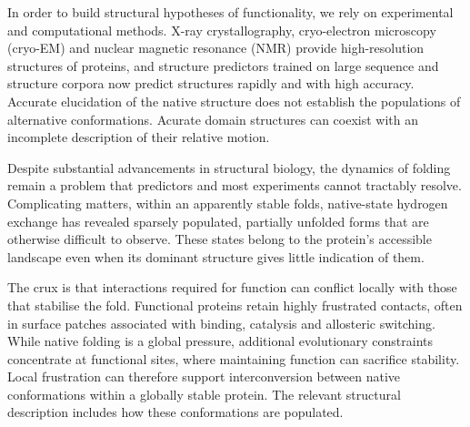 In order to build structural hypotheses of functionality, we rely on experimental and computational methods. X-ray crystallography, cryo-electron microscopy (cryo-EM) and nuclear magnetic resonance (NMR) provide high-resolution structures of proteins,\supercite{maveyraudProteinXrayCrystallography2020,baiHowCryoEMRevolutionizing2015,jamesAdvancesHydrogenDeuterium2022} and structure predictors trained on large sequence and structure corpora now predict structures rapidly and with high accuracy.\supercite{varadiAlphaFoldProteinStructure2022} Accurate elucidation of the native structure does not establish the populations of alternative conformations. Acurate domain structures can coexist with an incomplete description of their relative motion.\supercite{mccaffertyDoesAlphaFold2Model2023} 

Despite substantial advancements in structural biology, the dynamics of folding remain a problem that predictors and most experiments cannot tractably resolve.\supercite{laneMillisecondsChallengesSimulation2013,wilsonAlphaFold2RoleDisordered2022,mccaffertyDoesAlphaFold2Model2023} Complicating matters, within an apparently stable folds, native-state hydrogen exchange has revealed sparsely populated, partially unfolded forms that are otherwise difficult to observe.\supercite{englanderHydrogenExchangeModern1997} These states belong to the protein's accessible landscape even when its dominant structure gives little indication of them.


The crux is that interactions required for function can conflict locally with those that stabilise the fold. Functional proteins retain highly frustrated contacts, often in surface patches associated with binding, catalysis and allosteric switching.\supercite{parraFrustrationPhysiologyMolecular2025, lisiAllosteryEnzymeCatalysis2017} While native folding is a global pressure, additional evolutionary constraints concentrate at functional sites, where maintaining function can sacrifice stability.\supercite{galpernProbingDarkEnergy2026} Local frustration can therefore support interconversion between native conformations within a globally stable protein.\supercite{parraFrustrationPhysiologyMolecular2025} The relevant structural description includes how these conformations are populated.

